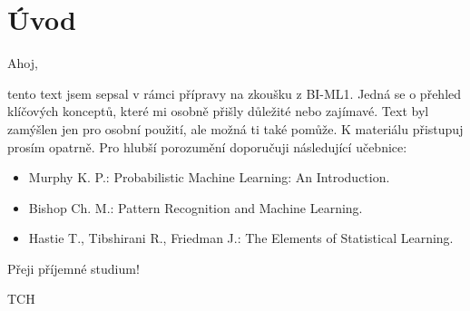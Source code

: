 \section{Úvod}

Ahoj,

tento text jsem sepsal v rámci přípravy na zkoušku z BI-ML1. Jedná se o přehled klíčových konceptů, které mi osobně přišly důležité nebo zajímavé. Text byl zamýšlen jen pro osobní použití, ale možná ti také pomůže. K materiálu přistupuj prosím opatrně. Pro hlubší porozumění doporučuji následující učebnice:
\begin{itemize}
    \item Murphy K. P.: Probabilistic Machine Learning: An Introduction.
    \item Bishop Ch. M.: Pattern Recognition and Machine Learning.
    \item Hastie T., Tibshirani R., Friedman J.: The Elements of Statistical Learning.
\end{itemize}

Přeji příjemné studium!

\begin{flushright}
    TCH
\end{flushright}
